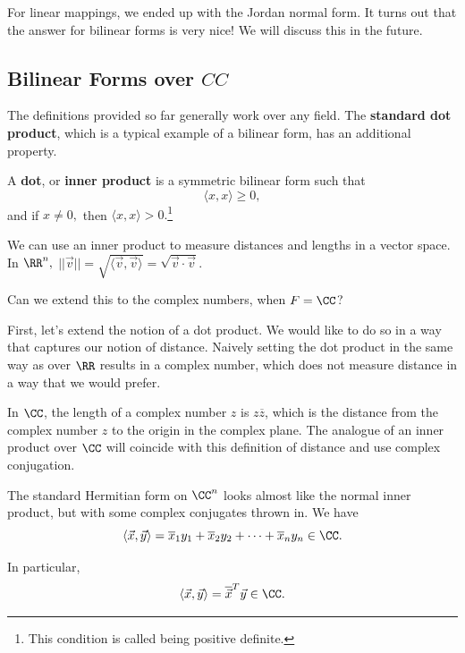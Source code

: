 For linear mappings, we ended up with the Jordan normal form. It turns out that the answer for bilinear forms is very nice! We will discuss this in the future. 

\subsection{Bilinear Forms over \texorpdfstring{$CC$}{C}}
The definitions provided so far generally work over any field. The \textbf{standard dot product}, which is a typical example of a bilinear form, has an additional property.

\begin{definition}
A \textbf{dot}, or \textbf{inner product} is a symmetric bilinear form such that 
\[
\langle x, x \rangle \geq 0,\] and if $x \neq 0,$ then $\langle x, x \rangle > 0.$\footnote{This condition is called being positive definite.}

\end{definition}

We can use an inner product to measure distances and lengths in a vector space. In $\RR^n,$ $||\vec{v}|| = \sqrt{\langle \vec{v}, \vec{v} \rangle} = \sqrt{\vec{v} \cdot \vec{v}}.$

\begin{qq}
Can we extend this to the complex numbers, when $F = \CC$?
\end{qq}

First, let's extend the notion of a dot product. We would like to do so in a way that captures our notion of distance. Naively setting the dot product in the same way as over $\RR$ results in a complex number, which does not measure distance in a way that we would prefer. 

In $\CC$, the length of a complex number $z$ is $z\overline{z}$, which is the distance from the complex number $z$ to the origin in the complex plane. The analogue of an inner product over $\CC$ will coincide with this definition of distance and use complex conjugation.

\begin{definition}
The standard Hermitian form on $\CC^n$ looks almost like the normal inner product, but with some complex conjugates thrown in. We have 
\[
\langle \vec{x}, \vec{y} \rangle = \overline{x}_1y_1 + \overline{x}_2y_2 + \cdots + \overline{x}_ny_n \in \CC.
\]

In particular, \[\langle \vec{x}, \vec{y} \rangle = \overline{\vec{x}}^T\vec{y} \in \CC.\]
\end{definition}

